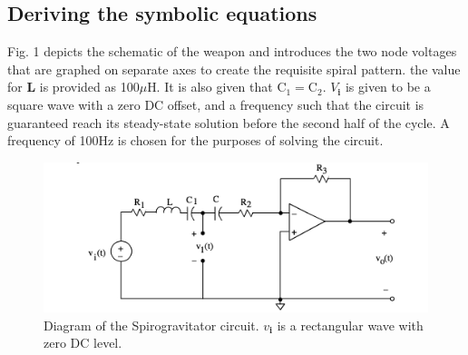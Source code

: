 \documentclass[conference]{IEEEtran}
\begin{document}
\subsection{Deriving the symbolic equations}
Fig. 1 depicts the schematic of the weapon and introduces the two node voltages that are graphed on separate axes to create the requisite spiral pattern. the value for \textbf{L} is provided as 100$\mu$H. It is also given that $\text{C}_1 = \text{C}_2$. $V_{\textbf{i}}$ is given to be a square wave with a zero DC offset, and a frequency such that the circuit is guaranteed reach its steady-state solution before the second half of the cycle. A frequency of 100Hz is chosen for the purposes of solving the circuit.
\begin{figure}[h]
    \centering
    \includegraphics[scale=.5]{fig1.png}
    \caption{Diagram of the Spirogravitator circuit. $v_{\textbf{i}}$ is a rectangular wave with zero DC level.}
    \label{fig:circuit}
\end{figure}
\end{document}
